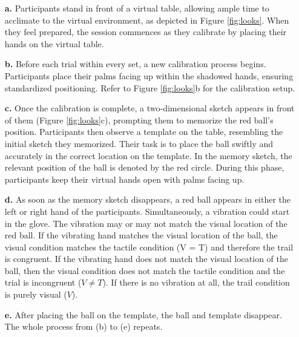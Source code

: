 \documentclass[12pt,oneside,openright]{report}
\begin{document}
\begin{enumerate}
    \item[\textbf{a.}] Participants stand in front of a virtual table, allowing ample time to acclimate to the virtual environment, as depicted in Figure \ref{fig:looks}. When they feel prepared, the session commences as they calibrate by placing their hands on the virtual table.

    \item[\textbf{b.}] Before each trial within every set, a new calibration process begins. Participants place their palms facing up within the shadowed hands, ensuring standardized positioning. Refer to Figure \ref{fig:looks}b for the calibration setup.
    
    \item[\textbf{c.}] Once the calibration is complete, a two-dimensional sketch appears in front of them (Figure \ref{fig:looks}c), prompting them to memorize the red ball's position. Participants then observe a template on the table, resembling the initial sketch they memorized. Their task is to place the ball swiftly and accurately in the correct location on the template. In the memory sketch, the relevant position of the ball is denoted by the red circle. During this phase, participants keep their virtual hands open with palms facing up.
    
    \item[\textbf{d.}] As soon as the memory sketch disappears, a red ball appears in either the left or right hand of the participants. Simultaneously, a vibration could start in the glove. The vibration may or may not match the visual location of the red ball. If the vibrating hand matches the visual location of the ball,  the visual condition matches the tactile condition (V = T) and therefore the trail is congruent. If the vibrating hand does not match the visual location of the ball, then the visual condition does not match the tactile condition and the trial is incongruent ($V \neq T$). If there is no vibration at all, the trail condition is purely visual ($V$).
   
    \item[\textbf{e.}] After placing the ball on the template, the ball and template disappear. The whole process from (b) to (e) repeats.
\end{enumerate}
\end{document}
